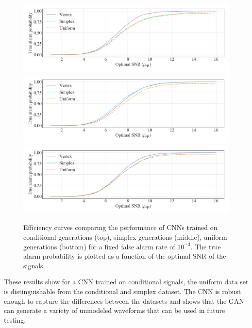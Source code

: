 \documentclass[12pt]{iopart}
\newcommand{\chris}[1]{\textbf{\textcolor{green}{CHRIS: #1}}}
\begin{document}
\begin{figure}
    \centering
    \includegraphics[width=\textwidth]{figures/conditional_trained.png}
    \includegraphics[width=\textwidth]{figures/simplex_trained.png}
    \includegraphics[width=\textwidth]{figures/uniform_trained.png}
    \caption{Efficiency curves comparing the performance of \acp{CNN} trained on
conditional generations (top), simplex generations (middle), uniform
generations (bottom) for a fixed false alarm rate of $10^{-3}$. The true alarm probability is plotted as a function of the optimal SNR of the signals.}
\label{fig:roc_curves} 
\end{figure}

These results show for a \ac{CNN} trained on conditional signals, the uniform data
set is distinguishable from the conditional and simplex dataset. The \ac{CNN} is
robust enough to capture the differences between the datasets and shows that
the GAN can generate a variety of unmodeled waveforms that can be used in
future testing. 

\end{document}
